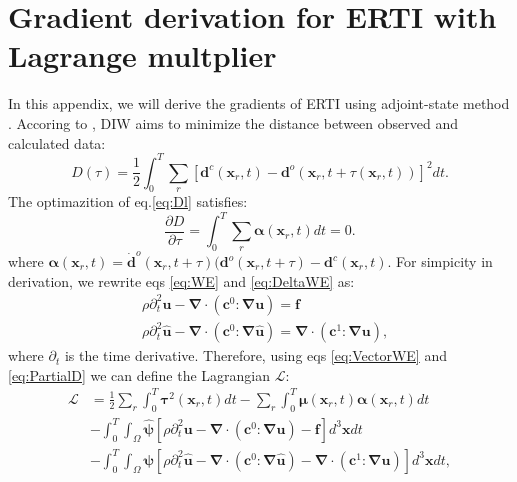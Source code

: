 \documentclass[extra,mreferee]{gji}
\newcommand{\bsy}[1]{\boldsymbol{{}#1}}
\begin{document}
\section{Gradient derivation for ERTI with Lagrange multplier}
In this appendix, we will derive the gradients of ERTI using adjoint-state method 
\cite[]{plessix2006,Liu2006}. Accoring to \cite{Hale2013}, DIW aims to minimize the
distance between observed and calculated data:
\begin{equation}
	D(\tau)=\frac{1}{2}\int^T_0\sum_r\left[
	\mathbf{d}^c(\mathbf{x}_r,t)-
	\mathbf{d}^o(\mathbf{x}_r,t+\tau(\mathbf{x}_r,t))\right]^2dt.
        \label{eq:Dl}
\end{equation}
The optimazition of eq.\eqref{eq:Dl} satisfies:
\begin{equation}
	\frac{\partial D}{\partial \tau}=\int^T_0\sum_r
	\bsy{\alpha}(\mathbf{x}_r,t)dt=0.
        \label{eq:PartialD}
\end{equation}
where $\bsy{\alpha}(\mathbf{x}_r,t)=\dot{\mathbf{d}}^o(\mathbf{x}_r,t+\tau)(\mathbf{d}^o(\mathbf{x}_r,t+\tau)-
\mathbf{d}^c(\mathbf{x}_r,t)$.
For simpicity in derivation, we rewrite eqs \eqref{eq:WE} and \eqref{eq:DeltaWE} as:
\begin{equation}
	\begin{split}
	&\rho\partial^2_t \mathbf{u} -\bsy{\nabla\cdot}
	(\bsy{\mathbf{c}}^0\bsy{:\nabla\mathbf{u}}) = \mathbf{f}\\
	&\rho\partial^2_t
	\mathbf{\hat{u}}-\bsy{\nabla\cdot}(\bsy{\mathbf{c}}^0\bsy{:\nabla\mathbf{\hat{u}}})=
	\bsy{\nabla\cdot}(\mathbf{c}^1\bsy{:\nabla\mathbf{u}}),
	\end{split}
        \label{eq:VectorWE}
\end{equation}
where $\partial_t$ is the time derivative.
Therefore, 
using eqs \eqref{eq:VectorWE} and \eqref{eq:PartialD}
we can define the Lagrangian $\mathcal{L}$: 
\begin{equation}
	\begin{split}
		\mathcal{L}
		&=\frac{1}{2}\sum_{r}\int^T_0\bsy{\tau}^2(\mathbf{x}_r,t)dt -\sum_{r}\int^T_0
		\bsy{\mu}(\mathbf{x}_r,t)\bsy{\alpha}(\mathbf{x}_r,t)dt\\
	&-\int^T_0\int_{\Omega} \bsy{\hat \psi}\left[\rho\partial^2_t \mathbf{u} -\bsy{\nabla
	\cdot}
	(\bsy{\mathbf{c}}^0\bsy{:}\bsy{\nabla\mathbf{u}}) - \mathbf{f}\right]d^3\mathbf{x}dt\\
	&-\int^T_0\int_{\Omega} \bsy{\psi}\left[\rho\partial^2_t
	\mathbf{\hat{u}}-\bsy{\nabla\cdot}(\bsy{\mathbf{c}}^0\bsy{:\nabla\mathbf{\hat{u}}})-
	\bsy{\nabla\cdot}(\mathbf{c}^1\bsy{:\nabla\mathbf{u}})\right]d^3\mathbf{x}dt,
	\end{split}
        \label{eq:Lagrangian}
\end{equation}
\end{document}
